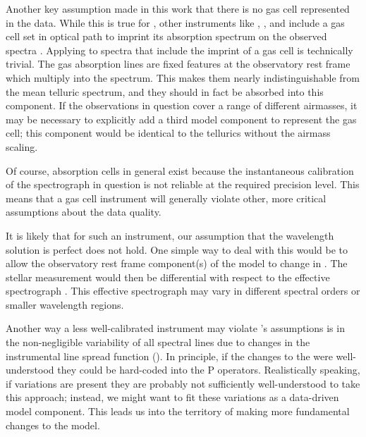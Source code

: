 \documentclass[modern]{aastex62}
\begin{document}
Another key assumption made in this work that there is no gas cell represented in the data.
While this is true for \HARPS, other instruments like , , and  include a gas cell set in optical path to imprint its absorption spectrum on the observed spectra .
Applying \wobble to spectra that include the imprint of a gas cell is technically trivial.
The gas absorption lines are fixed features at the observatory rest frame which multiply into the spectrum.
This makes them nearly indistinguishable from the mean telluric spectrum, and they should in fact be absorbed into this component.
If the observations in question cover a range of different airmasses, it may be necessary to explicitly add a third model component to represent the gas cell; this component would be identical to the tellurics without the airmass scaling.

Of course, absorption cells in general exist because the instantaneous calibration of the spectrograph in question is not reliable at the required \RV precision level.
This means that a gas cell instrument will generally violate other, more critical assumptions about the data quality.

It is likely that for such an instrument, our assumption that the wavelength solution is perfect does not hold.
One simple way to deal with this would be to allow the observatory rest frame component(s) of the model to change in \RV.
The stellar \RV measurement would then be differential with respect to the effective spectrograph \RV.
This effective spectrograph \RV may vary in different spectral orders or smaller wavelength regions. 

Another way a less well-calibrated instrument may violate \wobble's assumptions is in the non-negligible variability of all spectral lines due to changes in the instrumental line spread function (\LSF).
In principle, if the changes to the \LSF were well-understood they could be hard-coded into the P operators.
Realistically speaking, if \LSF variations are present they are probably not sufficiently well-understood to take this approach; instead, we might want to fit these variations as a data-driven model component.
This leads us into the territory of making more fundamental changes to the \wobble model.
\end{document}
